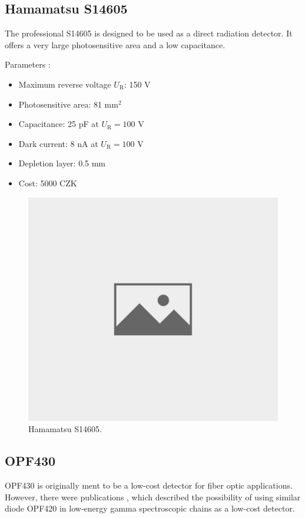 \subsection{Hamamatsu S14605}
The professional S14605 is designed to be used as a direct radiation detector. It offers a very large photosensitive area and a low capacitance.

Parameters \cite{datS14605}:
\begin{itemize}
\item Maximum reverse voltage $U_\textrm{R}$: 150 V
\item Photosensitive area: 81 mm$^2$
\item Capacitance: 25 pF at $U_\textrm{R} = 100$ V
\item Dark current: 8 nA at $U_\textrm{R} = 100$ V
\item Depletion layer: 0.5 mm
\item Cost: 5000 CZK
\end{itemize}

\begin{figure}[H]
 \centering
 \includegraphics[scale=0.35, angle = 0]{./pictures/NoPicture.jpg}
 \caption{Hamamatsu S14605.}
 \label{S14605}
 
\end{figure}

\subsection{OPF430}
OPF430 is originally ment to be a low-cost detector for fiber optic applications. However, there were publications \cite{RAMIREZJIMENEZ2003577}, which described the possibility of using similar diode OPF420 in low-energy gamma spectroscopic chains as a low-cost detector.

